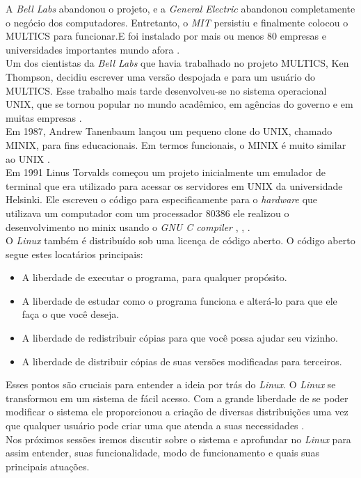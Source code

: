 A \emph{Bell Labs} abandonou o projeto, e a \emph{General Electric} abandonou completamente o negócio dos computadores. Entretanto, o \emph{MIT} persistiu e finalmente colocou o MULTICS para funcionar.E foi instalado por mais ou menos 80 empresas e universidades importantes mundo afora \cite{Tanenbaum2016}.\\
Um dos cientistas da \emph{Bell Labs} que havia trabalhado no projeto MULTICS, Ken Thompson, decidiu escrever uma versão despojada e para um usuário do MULTICS. Esse trabalho mais tarde desenvolveu-se no sistema operacional UNIX, que se tornou popular no mundo acadêmico, em agências do governo e em muitas empresas \cite{Tanenbaum2016}.\\
Em 1987, Andrew Tanenbaum lançou um pequeno clone do UNIX, chamado MINIX, para fins educacionais. Em termos funcionais, o MINIX é muito similar ao UNIX \cite{Tanenbaum2016}.\\
Em 1991 Linus Torvalds começou um projeto inicialmente um emulador de terminal que era utilizado para acessar os servidores em UNIX da universidade Helsinki. Ele escreveu o código para especificamente  para o \emph{hardware} que utilizava um computador com um processador 80386 ele realizou o desenvolvimento no minix usando o \emph{GNU C compiler} \cite{Torvalds1991}, \cite{Torvalds1993}, \cite{torvalds2002}.\\
O \emph{Linux} também é distribuído sob uma licença de código aberto. O código aberto segue estes locatários principais:
\begin{itemize}
    \item A liberdade de executar o programa, para qualquer propósito.
    \item A liberdade de estudar como o programa funciona e alterá-lo para que ele faça o que você deseja.
    \item A liberdade de redistribuir cópias para que você possa ajudar seu vizinho.
    \item A liberdade de distribuir cópias de suas versões modificadas para terceiros.
\end{itemize}
Esses pontos são cruciais para entender a ideia por trás do \emph{Linux}. O \emph{Linux} se transformou em um sistema de fácil acesso. Com a grande liberdade de se poder modificar o sistema ele proporcionou a criação de diversas distribuições uma vez que qualquer usuário pode criar uma que atenda a suas necessidades \cite{LinuxFundationWIL}.\\
Nos próximos sessões  iremos discutir sobre o sistema e aprofundar no \emph{Linux} para assim entender, suas funcionalidade, modo de funcionamento e  quais suas principais atuações.\\









